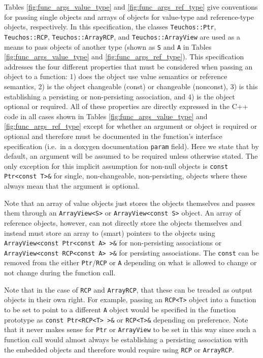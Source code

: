 Tables {}\ref{fig:func_args_value_type} and {}\ref{fig:func_args_ref_type}
give conventions for passing single objects and arrays of objects for
value-type {} and reference-type
{} objects, respectively.  In this specification,
the classes {}\texttt{Teuchos\-::Ptr}, {}\texttt{Teuchos\-::RCP},
{}\texttt{Teuchos\-::ArrayRCP}, and {}\texttt{Teuchos\-::ArrayView} are used
as a means to pass objects of another type (shown as {}\texttt{S} and
{}\texttt{A} in Tables {}\ref{fig:func_args_value_type} and
{}\ref{fig:func_args_ref_type}).  This specification addresses the four
different properties that must be considered when passing an object to a
function: 1) does the object use value semantics or reference semantics, 2) is
the object changeable (const) or changeable (nonconst), 3) is this
establishing a persisting or non-persisting association, and 4) is the object
optional or required.  All of these properties are directly expressed in the
C++ code in all cases shown in Tables {}\ref{fig:func_args_value_type} and
{}\ref{fig:func_args_ref_type} except for whether an argument or object is
required or optional and therefore must be documented in the function's
interface specification (i.e.\ in a doxygen documentation {}\texttt{param}
field).  Here we state that by default, an argument will be assumed to be
required unless otherwise stated.  The only exception for this implicit
assumption for non-null objects is {}\texttt{const Ptr<const T>\&} for single,
non-changeable, non-persisting, objects where these always mean that the
argument is optional.

Note that an array of value objects just stores the objects themselves and
passes them through an {}\texttt{ArrayView<S>} or {}\texttt{ArrayView<const
S>} object.  An array of reference objects, however, can not directly store
the objects themselves and instead must store an array to (smart) pointers to
the objects using {}\texttt{ArrayView<const Ptr<const A> >\&} for
non-persisting associations or {}\texttt{ArrayView<const RCP<const A> >\&} for
persisting associations.  The {}\texttt{const} can be removed from the either
{}\texttt{Ptr}/{}\texttt{RCP} or {}\texttt{A} depending on what is allowed to
change or not change during the function call.

Note that in the case of {}\texttt{RCP} and {}\texttt{ArrayRCP}, that these
can be treaded as output objects in their own right.  For example, passing an
{}\texttt{RCP<T>} object into a function to be set to point to a different
{}\texttt{A} object would be specified in the function prototype as
{}\texttt{const Ptr<RCP<T> >\&} or {}\texttt{RCP<T>\&} depending on
preference.  Note that it never makes sense for {}\texttt{Ptr} or
{}\texttt{ArrayView} to be set in this way since such a function call would
almost always be establishing a persisting association with the embedded
objects and therefore would require using {}\texttt{RCP} or
{}\texttt{ArrayRCP}.


